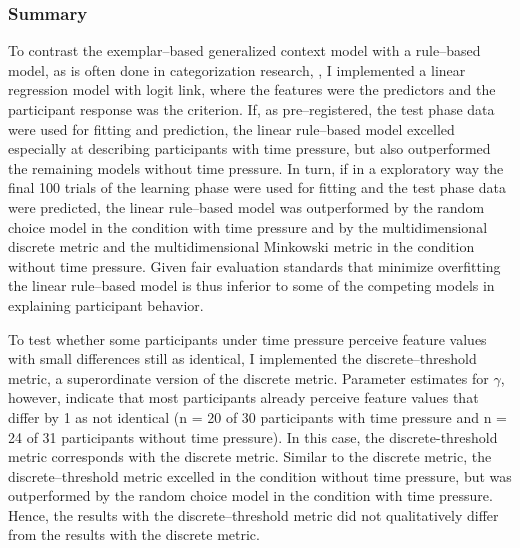\documentclass[a4paper,man,natbib]{apa6}
\begin{document}
\subsubsection{Summary}
To contrast the exemplar--based generalized context model with a rule--based model, as is often done in categorization research, \citep{restle1962selection, tom1968attention, rouder2006comparing}, I implemented a linear regression model with logit link, where the features were the predictors and the participant response was the criterion. 
If, as pre--registered, the test phase data were used for fitting and prediction, the linear rule--based model excelled especially at describing participants with time pressure, but also outperformed the remaining models without time pressure. In turn, if in a exploratory way the final 100 trials of the learning phase were used for fitting and the test phase data were predicted, the linear rule--based model was outperformed by the random choice model in the condition with time pressure and by the multidimensional discrete metric and the multidimensional Minkowski metric in the condition without time pressure. Given fair evaluation standards that minimize overfitting the linear rule--based model is thus inferior to some of the competing models in explaining participant behavior.

To test whether some participants under time pressure perceive feature values with small differences still as identical, I implemented the discrete--threshold metric, a superordinate version of the discrete metric. Parameter estimates for $\gamma$, however, indicate that most participants already perceive feature values that differ by 1 as not identical (n = 20 of 30 participants with time pressure and n = 24 of 31 participants without time pressure). In this case, the discrete-threshold metric corresponds with the discrete metric. Similar to the discrete metric, the discrete--threshold metric excelled in the condition without time pressure, but was outperformed by the random choice model in the condition with time pressure. 
Hence, the results with the discrete--threshold metric did not qualitatively differ from the results with the discrete metric.
\end{document}
